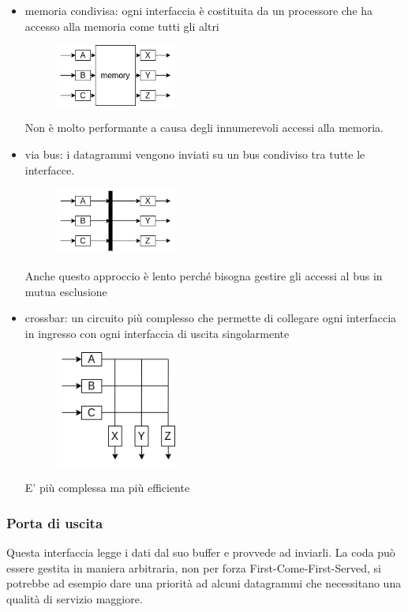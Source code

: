 \begin{itemize}
    \item memoria condivisa:
    ogni interfaccia è costituita da un processore che ha accesso alla memoria come tutti gli altri
    \begin{figure}[H]
        \centering
        \includegraphics[width=150px]{images/5_Internetworking/memory.png}
    \end{figure}
    Non è molto performante a causa degli innumerevoli accessi alla memoria.

    \item via bus: i datagrammi vengono inviati su un bus condiviso tra tutte le interfacce.
    \begin{figure}[H]
        \centering
        \includegraphics[width=150px]{images/5_Internetworking/bus.png}
    \end{figure}
    Anche questo approccio è lento perché bisogna gestire gli accessi al bus in mutua esclusione

    \item crossbar: un circuito più complesso che permette di collegare ogni interfaccia in ingresso con ogni interfaccia di uscita singolarmente
    \begin{figure}[H]
        \centering
        \includegraphics[width=150px]{images/5_Internetworking/crossbar.png}
    \end{figure}
    E' più complessa ma più efficiente
\end{itemize}

\subsubsection{Porta di uscita}
Questa interfaccia legge i dati dal suo buffer e provvede ad inviarli.
La coda può essere gestita in maniera arbitraria, non per forza First-Come-First-Served, si potrebbe ad esempio dare una priorità ad alcuni datagrammi che necessitano una qualità di servizio maggiore.

